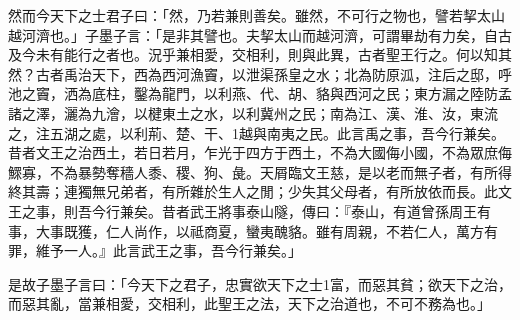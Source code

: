 \begin{pinyinscope}
然而今天下之士君子曰：「然，乃若兼則善矣。雖然，不可行之物也，譬若挈太山越河濟也。」子墨子言：「是非其譬也。夫挈太山而越河濟，可謂畢劫有力矣，自古及今未有能行之者也。況乎兼相愛，交相利，則與此異，古者聖王行之。何以知其然？古者禹治天下，西為西河漁竇，以泄渠孫皇之水；北為防原泒，注后之邸，呼池之竇，洒為底柱，鑿為龍門，以利燕、代、胡、貉與西河之民；東方漏之陸防孟諸之澤，灑為九澮，以楗東土之水，以利冀州之民；南為江、漢、淮、汝，東流之，注五湖之處，以利荊、楚、干、1越與南夷之民。此言禹之事，吾今行兼矣。昔者文王之治西土，若日若月，乍光于四方于西土，不為大國侮小國，不為眾庶侮鰥寡，不為暴勢奪穡人黍、稷、狗、彘。天屑臨文王慈，是以老而無子者，有所得終其壽；連獨無兄弟者，有所雜於生人之閒；少失其父母者，有所放依而長。此文王之事，則吾今行兼矣。昔者武王將事泰山隧，傳曰：『泰山，有道曾孫周王有事，大事既獲，仁人尚作，以祗商夏，蠻夷醜貉。雖有周親，不若仁人，萬方有罪，維予一人。』此言武王之事，吾今行兼矣。」

是故子墨子言曰：「今天下之君子，忠實欲天下之士1富，而惡其貧；欲天下之治，而惡其亂，當兼相愛，交相利，此聖王之法，天下之治道也，不可不務為也。」


\end{pinyinscope}